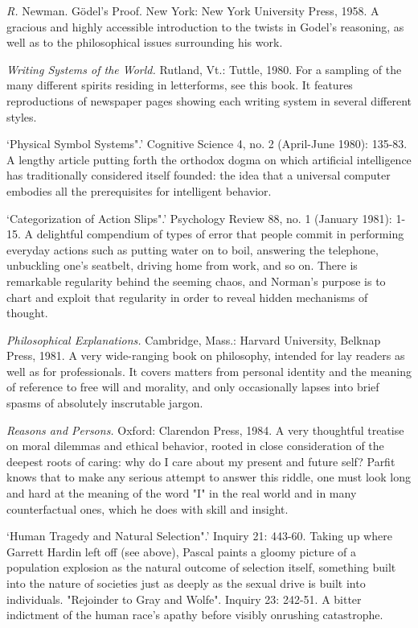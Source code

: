  {\sl R.} Newman. Gödel’s Proof. New York: New York University Press, 1958. A gracious and highly accessible introduction to the twists in Godel's reasoning, as well as to the philosophical issues surrounding his work.

 {\sl Writing Systems of the World.} Rutland, Vt.: Tuttle, 1980. For a sampling of the many different spirits residing in letterforms, see this book. It features reproductions of newspaper pages showing each writing system in several different styles.

 `Physical Symbol Systems".' Cognitive Science 4, no. 2 (April-June 1980): 135-83. A lengthy article putting forth the orthodox dogma on which artificial intelligence has traditionally considered itself founded: the idea that a universal computer embodies all the prerequisites for intelligent behavior.

 `Categorization of Action Slips".' Psychology Review 88, no. 1 (January 1981): 1-15. A delightful compendium of types of error that people commit in performing everyday actions such as putting water on to boil, answering the telephone, unbuckling one's seatbelt, driving home from work, and so on. There is remarkable regularity behind the seeming chaos, and Norman's purpose is to chart and exploit that regularity in order to reveal hidden mechanisms of thought.

 {\sl Philosophical Explanations.} Cambridge, Mass.: Harvard University, Belknap Press, 1981. A very wide-ranging book on philosophy, intended for lay readers as well as for professionals. It covers matters from personal identity and the meaning of reference to free will and morality, and only occasionally lapses into brief spasms of absolutely inscrutable jargon.

 {\sl Reasons and Persons.} Oxford: Clarendon Press, 1984. A very thoughtful treatise on moral dilemmas and ethical behavior, rooted in close consideration of the deepest roots of caring: why do I care about my present and future self? Parfit knows that to make any serious attempt to answer this riddle, one must look long and hard at the meaning of the word "I" in the real world and in many counterfactual ones, which he does with skill and insight.

 `Human Tragedy and Natural Selection".' Inquiry 21: 443-60. Taking up where Garrett Hardin left off (see above), Pascal paints a gloomy picture of a population explosion as the natural outcome of selection itself, something built into the nature of societies just as deeply as the sexual drive is built into individuals. "Rejoinder to Gray and Wolfe". Inquiry 23: 242-51. A bitter indictment of the human race's apathy before visibly onrushing catastrophe.

